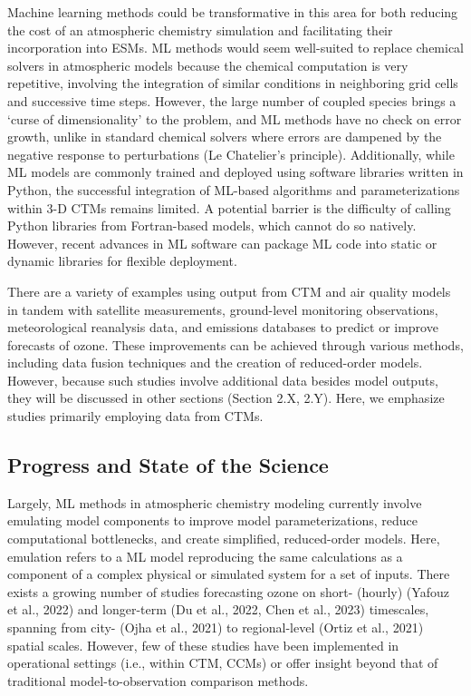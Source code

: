 \documentclass[gmd, manuscript]{copernicus}
\begin{document}
Machine learning methods could be transformative in this area for both reducing the cost of an atmospheric chemistry simulation and facilitating their incorporation into ESMs. ML methods would seem well-suited to replace chemical solvers in atmospheric models because the chemical computation is very repetitive, involving the integration of similar conditions in neighboring grid cells and successive time steps. However, the large number of coupled species brings a ‘curse of dimensionality’ to the problem, and ML methods have no check on error growth, unlike in standard chemical solvers where errors are dampened by the negative response to perturbations (Le Chatelier’s principle). Additionally, while ML models are commonly trained and deployed using software libraries written in Python, the successful integration of ML-based algorithms and parameterizations within 3-D CTMs remains limited. A potential barrier is the difficulty of calling Python libraries from Fortran-based models, which cannot do so natively. However, recent advances in ML software can package ML code into static or dynamic libraries for flexible deployment.
                                                                             
There are a variety of examples using output from CTM and air quality models in tandem with satellite measurements, ground-level monitoring observations, meteorological reanalysis data, and emissions databases to predict or improve forecasts of ozone. These improvements can be achieved through various methods, including data fusion techniques and the creation of reduced-order models. However, because such studies involve additional data besides model outputs, they will be discussed in  other sections (Section 2.X, 2.Y). Here, we emphasize studies primarily employing data from CTMs.

\subsection{Progress and State of the Science}
Largely, ML methods in atmospheric chemistry modeling currently involve emulating model components to improve model parameterizations, reduce computational bottlenecks, and create simplified, reduced-order models. Here, emulation refers to a ML model reproducing the same calculations as a component of a complex physical or simulated system for a set of inputs. There exists a growing number of studies forecasting ozone on short- (hourly) (Yafouz et al., 2022) and longer-term (Du et al., 2022, Chen et al., 2023) timescales, spanning from city- (Ojha et al., 2021) to regional-level (Ortiz et al., 2021) spatial scales. However, few of these studies have been implemented in operational settings (i.e., within CTM, CCMs) or offer insight beyond that of traditional model-to-observation comparison methods.   
\end{document}
